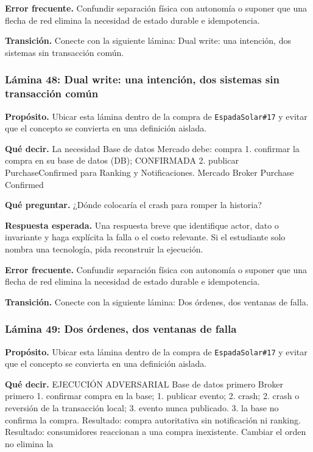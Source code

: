 \documentclass[variant=docente,cover=institutional,mode=screen]{ua-engineering-v6-article}
\begin{document}
\textbf{Error frecuente.} Confundir separación física con autonomía o suponer que una flecha de red elimina la necesidad de estado durable e idempotencia.

\textbf{Transición.} Conecte con la siguiente lámina: Dual write: una intención, dos sistemas sin transacción común.

\subsubsection*{Lámina 48: Dual write: una intención, dos sistemas sin transacción común}
\textbf{Propósito.} Ubicar esta lámina dentro de la compra de \texttt{EspadaSolar\#17} y evitar que el concepto se convierta en una definición aislada.

\textbf{Qué decir.} La necesidad Base de datos Mercado debe: compra 1. confirmar la compra en su base de datos (DB); CONFIRMADA 2. publicar PurchaseConfirmed para Ranking y Notificaciones. Mercado Broker Purchase Confirmed

\textbf{Qué preguntar.} ¿Dónde colocaría el crash para romper la historia?

\textbf{Respuesta esperada.} Una respuesta breve que identifique actor, dato o invariante y haga explícita la falla o el costo relevante. Si el estudiante solo nombra una tecnología, pida reconstruir la ejecución.

\textbf{Error frecuente.} Confundir separación física con autonomía o suponer que una flecha de red elimina la necesidad de estado durable e idempotencia.

\textbf{Transición.} Conecte con la siguiente lámina: Dos órdenes, dos ventanas de falla.

\subsubsection*{Lámina 49: Dos órdenes, dos ventanas de falla}
\textbf{Propósito.} Ubicar esta lámina dentro de la compra de \texttt{EspadaSolar\#17} y evitar que el concepto se convierta en una definición aislada.

\textbf{Qué decir.} EJECUCIÓN ADVERSARIAL Base de datos primero Broker primero 1. confirmar compra en la base; 1. publicar evento; 2. crash; 2. crash o reversión de la transacción local; 3. evento nunca publicado. 3. la base no confirma la compra. Resultado: compra autoritativa sin notificación ni ranking. Resultado: consumidores reaccionan a una compra inexistente. Cambiar el orden no elimina la 
\end{document}
